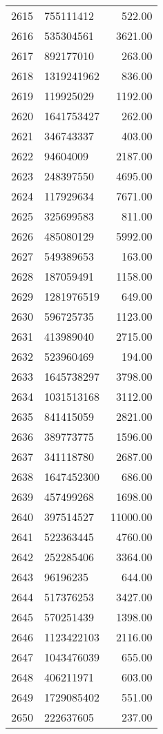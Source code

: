 \begin{table}[ht]
\begin{tabular}{rlr}
  2615 & 755111412 & 522.00 \\ 
  2616 & 535304561 & 3621.00 \\ 
  2617 & 892177010 & 263.00 \\ 
  2618 & 1319241962 & 836.00 \\ 
  2619 & 119925029 & 1192.00 \\ 
  2620 & 1641753427 & 262.00 \\ 
  2621 & 346743337 & 403.00 \\ 
  2622 & 94604009 & 2187.00 \\ 
  2623 & 248397550 & 4695.00 \\ 
  2624 & 117929634 & 7671.00 \\ 
  2625 & 325699583 & 811.00 \\ 
  2626 & 485080129 & 5992.00 \\ 
  2627 & 549389653 & 163.00 \\ 
  2628 & 187059491 & 1158.00 \\ 
  2629 & 1281976519 & 649.00 \\ 
  2630 & 596725735 & 1123.00 \\ 
  2631 & 413989040 & 2715.00 \\ 
  2632 & 523960469 & 194.00 \\ 
  2633 & 1645738297 & 3798.00 \\ 
  2634 & 1031513168 & 3112.00 \\ 
  2635 & 841415059 & 2821.00 \\ 
  2636 & 389773775 & 1596.00 \\ 
  2637 & 341118780 & 2687.00 \\ 
  2638 & 1647452300 & 686.00 \\ 
  2639 & 457499268 & 1698.00 \\ 
  2640 & 397514527 & 11000.00 \\ 
  2641 & 522363445 & 4760.00 \\ 
  2642 & 252285406 & 3364.00 \\ 
  2643 & 96196235 & 644.00 \\ 
  2644 & 517376253 & 3427.00 \\ 
  2645 & 570251439 & 1398.00 \\ 
  2646 & 1123422103 & 2116.00 \\ 
  2647 & 1043476039 & 655.00 \\ 
  2648 & 406211971 & 603.00 \\ 
  2649 & 1729085402 & 551.00 \\ 
  2650 & 222637605 & 237.00 \\ 

\end{tabular}
\end{table}
